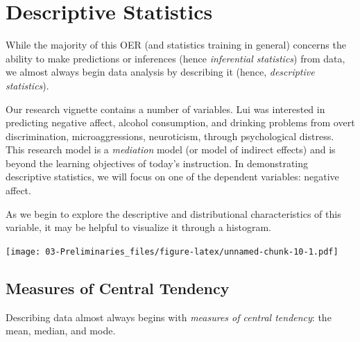 \documentclass[
  11pt,
]{book}
\newenvironment{Shaded}{\begin{snugshade}}{\end{snugshade}}
\newcommand{\AttributeTok}[1]{\textcolor[rgb]{0.27,0.27,0.27}{#1}}
\newcommand{\ConstantTok}[1]{\textcolor[rgb]{0.37,0.37,0.37}{#1}}
\newcommand{\FunctionTok}[1]{\textcolor[rgb]{0.27,0.27,0.27}{\textbf{#1}}}
\newcommand{\NormalTok}[1]{#1}
\newcommand{\SpecialCharTok}[1]{\textcolor[rgb]{0.43,0.43,0.43}{\textbf{#1}}}
\newcommand{\StringTok}[1]{\textcolor[rgb]{0.5,0.5,0.5}{#1}}
\begin{document}
\hypertarget{descriptive-statistics}{%
\section{Descriptive Statistics}\label{descriptive-statistics}}

While the majority of this OER (and statistics training in general) concerns the ability to make predictions or inferences (hence \emph{inferential statistics}) from data, we almost always begin data analysis by describing it (hence, \emph{descriptive statistics}).

Our research vignette contains a number of variables. Lui \citeyearpar{lui_racial_2020} was interested in predicting negative affect, alcohol consumption, and drinking problems from overt discrimination, microaggressions, neuroticism, through psychological distress. This research model is a \emph{mediation} model (or model of indirect effects) and is beyond the learning objectives of today's instruction. In demonstrating descriptive statistics, we will focus on one of the dependent variables: negative affect.

As we begin to explore the descriptive and distributional characteristics of this variable, it may be helpful to visualize it through a histogram.

\begin{Shaded}
\end{Shaded}

\texttt{[image: 03-Preliminaries\_files/figure-latex/unnamed-chunk-10-1.pdf]}

\hypertarget{measures-of-central-tendency}{%
\subsection{Measures of Central Tendency}\label{measures-of-central-tendency}}

Describing data almost always begins with \emph{measures of central tendency}: the mean, median, and mode.
\end{document}
